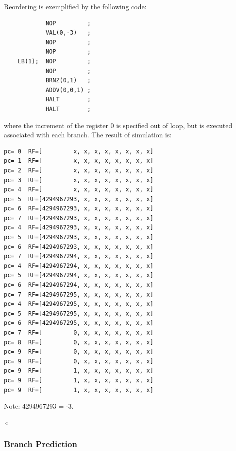\begin{exemplu}
Reordering is exemplified by the following code:
\begin{verbatim}
            NOP         ;
            VAL(0,-3)   ;
            NOP         ;
            NOP         ;
    LB(1);  NOP         ;
            NOP         ;
            BRNZ(0,1)   ;
            ADDV(0,0,1) ;
            HALT        ;
            HALT        ;
\end{verbatim}
where the increment of the register 0 is specified out of loop, but is executed associated with each branch.
The result of simulation is:
{\small
\begin{verbatim}
pc= 0  RF=[         x, x, x, x, x, x, x, x]
pc= 1  RF=[         x, x, x, x, x, x, x, x]
pc= 2  RF=[         x, x, x, x, x, x, x, x]
pc= 3  RF=[         x, x, x, x, x, x, x, x]
pc= 4  RF=[         x, x, x, x, x, x, x, x]
pc= 5  RF=[4294967293, x, x, x, x, x, x, x] 	
pc= 6  RF=[4294967293, x, x, x, x, x, x, x] 	
pc= 7  RF=[4294967293, x, x, x, x, x, x, x] 	
pc= 4  RF=[4294967293, x, x, x, x, x, x, x] 	
pc= 5  RF=[4294967293, x, x, x, x, x, x, x] 	
pc= 6  RF=[4294967293, x, x, x, x, x, x, x] 	
pc= 7  RF=[4294967294, x, x, x, x, x, x, x] 	
pc= 4  RF=[4294967294, x, x, x, x, x, x, x] 	
pc= 5  RF=[4294967294, x, x, x, x, x, x, x] 	
pc= 6  RF=[4294967294, x, x, x, x, x, x, x] 	
pc= 7  RF=[4294967295, x, x, x, x, x, x, x] 	
pc= 4  RF=[4294967295, x, x, x, x, x, x, x] 	
pc= 5  RF=[4294967295, x, x, x, x, x, x, x] 	
pc= 6  RF=[4294967295, x, x, x, x, x, x, x] 	
pc= 7  RF=[         0, x, x, x, x, x, x, x]
pc= 8  RF=[         0, x, x, x, x, x, x, x]
pc= 9  RF=[         0, x, x, x, x, x, x, x]
pc= 9  RF=[         0, x, x, x, x, x, x, x]
pc= 9  RF=[         1, x, x, x, x, x, x, x]
pc= 9  RF=[         1, x, x, x, x, x, x, x]
pc= 9  RF=[         1, x, x, x, x, x, x, x]
\end{verbatim}
}
Note: 4294967293 = -3.

$\diamond$
\end{exemplu}


\subsubsection{Branch Prediction}\label{sec:branch_prediction_origins}

